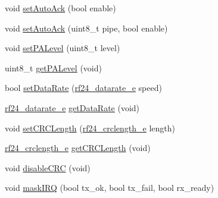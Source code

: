 \begin{DoxyCompactItemize}
void \hyperlink{classRF24_aec71746d59da978bcbb975167886a2cc}{set\+Auto\+Ack} (bool enable)
\item 
void \hyperlink{classRF24_a60dba9e558f3620ab489af68ea3dea9c}{set\+Auto\+Ack} (uint8\+\_\+t pipe, bool enable)
\item 
void \hyperlink{classRF24_adedac579590a668ae97baccab284de8a}{set\+P\+A\+Level} (uint8\+\_\+t level)
\item 
uint8\+\_\+t \hyperlink{classRF24_af7c4dcd84466168c5816382ceb366067}{get\+P\+A\+Level} (void)
\item 
bool \hyperlink{classRF24_aeb9920e7a95699748b003c4a839b0814}{set\+Data\+Rate} (\hyperlink{RF24_8h_a82745de4aa1251b7561564b3ed1d6522}{rf24\+\_\+datarate\+\_\+e} speed)
\item 
\hyperlink{RF24_8h_a82745de4aa1251b7561564b3ed1d6522}{rf24\+\_\+datarate\+\_\+e} \hyperlink{classRF24_a72a7b11dafe8ffab6135f243decce0d7}{get\+Data\+Rate} (void)
\item 
void \hyperlink{classRF24_a89f626fc4a58dd997153bcc0f8198b9e}{set\+C\+R\+C\+Length} (\hyperlink{RF24_8h_adbe00719f3f835c82bd007081d040a7e}{rf24\+\_\+crclength\+\_\+e} length)
\item 
\hyperlink{RF24_8h_adbe00719f3f835c82bd007081d040a7e}{rf24\+\_\+crclength\+\_\+e} \hyperlink{classRF24_aba4ca91b829afcd94a4c11e0343e3796}{get\+C\+R\+C\+Length} (void)
\item 
void \hyperlink{classRF24_a5eacd9ecfbc19864801d714c292cf8be}{disable\+C\+RC} (void)
\item 
void \hyperlink{classRF24_abf68b9b0c9cd17179e9e144c3e7f9c45}{mask\+I\+RQ} (bool tx\+\_\+ok, bool tx\+\_\+fail, bool rx\+\_\+ready)
\end{DoxyCompactItemize}


